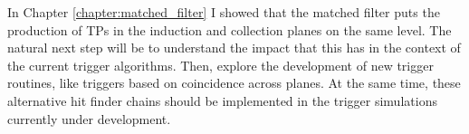 \begin{comment}
The DAQ system of the DUNE FD relies on the online identification of hits on channels, the so-called TPs, to form decisions data to store. The goal of Chapter \ref{chapter:matched_filter} is to motivate a method to enhance the production of TPs in the induction channels of the detectors. Forming TPs from all the charge readout planes will improve the redundancy of the trigger algorithms. Not only that, but this may be the key to have more complex trigger logic that requires directional information. The aspect I focused on to improve the hit finding is the filtering of the waveforms. In section \ref{sec:matched_filter_fir} I use a sample of ProtoDUNE-SP cosmic data to show how different low-pass FIR filters affect the S/N in the collection and induction planes. Then, I introduce the concept of the matched filter in section \ref{sec:matched_filter_matched_filter}. Using the same dataset, I demonstrate that the improvement in the S/N of the induction channels achieved with these filters can be significantly higher than with the standard filter approach. A series of studies using MC samples are presented in section \ref{sec:matched_filter_mc_studies}. These allow to study the dependence of the filtering on the orientation and the energy of the tracks. I also use them to assess the impact of this method on the hit sensitivity. Finally, in section \ref{sec:matched_filter_vdcoldbox} I briefly summarise the results from the VD ColdBox runs which featured the matched filter.

With these studies, I showed that the matched filter puts the production of TPs in the induction and collection planes on the same level. The natural next step will be to understand the impact that this has in the context of the current trigger algorithms. Then, explore the development of new trigger routines, like triggers based on coincidence across planes. At the same time, these alternative hit finder chains should be implemented in the trigger simulations currently under development.
\end{comment}

In Chapter \ref{chapter:matched_filter} I showed that the matched filter puts the production of TPs in the induction and collection planes on the same level. The natural next step will be to understand the impact that this has in the context of the current trigger algorithms. Then, explore the development of new trigger routines, like triggers based on coincidence across planes. At the same time, these alternative hit finder chains should be implemented in the trigger simulations currently under development.

